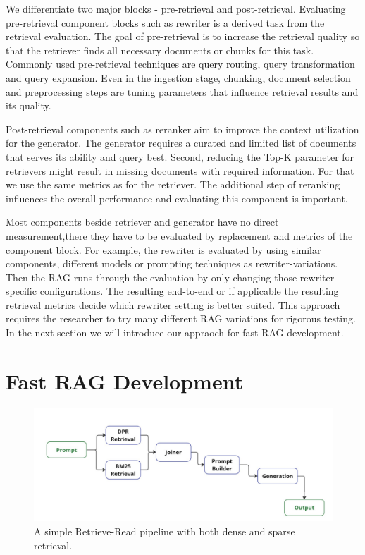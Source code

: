 We differentiate two major blocks - pre-retrieval and post-retrieval. Evaluating pre-retrieval component blocks such as rewriter is a derived task from the retrieval evaluation. The goal of pre-retrieval is to increase the retrieval quality so that the retriever finds all necessary documents or chunks for this task. Commonly used pre-retrieval techniques are query routing, query transformation and query expansion. Even in the ingestion stage, chunking, document selection and preprocessing steps are tuning parameters that influence retrieval results and its quality. 

Post-retrieval components such as reranker aim to improve the context utilization for the generator. The generator requires a curated and limited list of documents that serves its ability and query best. Second, reducing the Top-K parameter for retrievers might result in missing documents with required information. For that we use the same metrics as for the retriever. The additional step of reranking influences the overall performance and evaluating this component is important. 

Most components beside retriever and generator have no direct measurement,there they have to be evaluated by replacement and metrics of the component block. For example, the rewriter is evaluated by using similar components, different models or prompting techniques as rewriter-variations. Then the RAG runs through the evaluation by only changing those rewriter specific configurations. The resulting end-to-end or if applicable the resulting retrieval metrics decide which rewriter setting is better suited. This approach requires the researcher to try many different RAG variations for rigorous testing. In the next section we will introduce our appraoch for fast RAG development.

\section{Fast RAG Development}

\begin{figure}[b]
    \centering
    \includegraphics[width=\textwidth]{images/showcase-pipeline.pdf}
    \caption{A simple Retrieve-Read pipeline with both dense and sparse retrieval.}
    \label{fig:showcase}
\end{figure}

